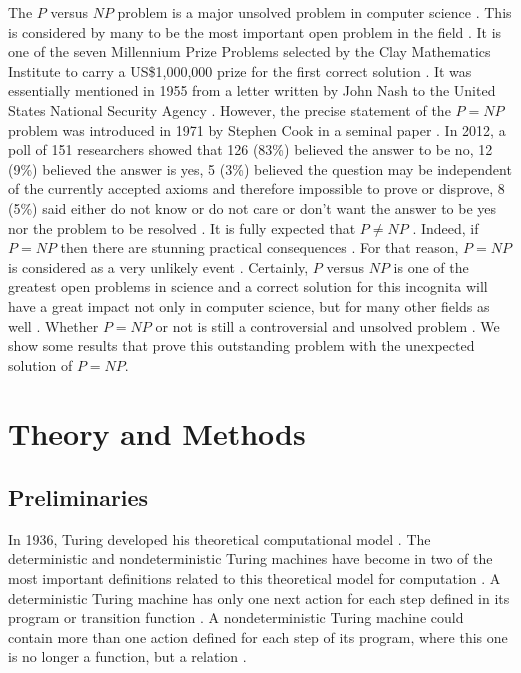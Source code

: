 \documentclass[a4paper,UKenglish,cleveref, autoref]{lipics-v2019}
\begin{document}
The $P$ versus $NP$ problem is a major unsolved problem in computer science \cite{CS00}. This is considered by many to be the most important open problem in the field \cite{CS00}. It is one of the seven Millennium Prize Problems selected by the Clay Mathematics Institute to carry a US\$1,000,000 prize for the first correct solution \cite{CS00}. It was essentially mentioned in 1955 from a letter written by John Nash to the United States National Security Agency \cite{AS17}. However, the precise statement of the $P=NP$ problem was introduced in 1971 by Stephen Cook in a seminal paper \cite{CS00}. In 2012, a poll of 151 researchers showed that 126 (83\%) believed the answer to be no, 12 (9\%) believed the answer is yes, 5 (3\%) believed the question may be independent of the currently accepted axioms and therefore impossible to prove or disprove, 8 (5\%) said either do not know or do not care or don't want the answer to be yes nor the problem to be resolved \cite{GA12}. It is fully expected that $P \neq NP$ \cite{Pap03}. Indeed, if $P = NP$ then there are stunning practical consequences \cite{Pap03}. For that reason, $P = NP$ is considered as a very unlikely event \cite{Pap03}. Certainly, $P$ versus $NP$ is one of the greatest open problems in science and a correct solution for this incognita will have a great impact not only in computer science, but for many other fields as well \cite{AS17}. Whether $P = NP$ or not is still a controversial and unsolved problem \cite{AS17}. We show some results that prove this outstanding problem with the unexpected solution of $P = NP$.

\section{Theory and Methods}

\subsection{Preliminaries}

In 1936, Turing developed his theoretical computational model \cite{MS06}. The deterministic and nondeterministic Turing machines have become in two of the most important definitions related to this theoretical model for computation \cite{MS06}. A deterministic Turing machine has only one next action for each step defined in its program or transition function \cite{MS06}. A nondeterministic Turing machine could contain more than one action defined for each step of its program, where this one is no longer a function, but a relation \cite{MS06}.
\end{document}
